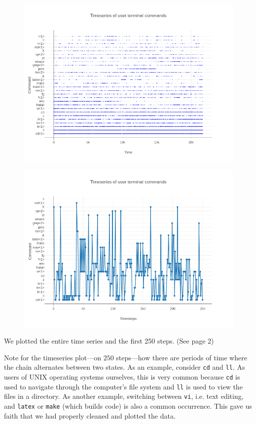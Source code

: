 \documentclass[10pt]{article}
\begin{document}
\begin{figure}[!htb]
  \centering
  \includegraphics[scale=.45]{../pictures/complete-empirical-timeseries.png}
  \caption{}
\end{figure}

\begin{figure}[!htb]
  \centering
  \includegraphics[scale=.45]{../pictures/250-empirical-timesteps.png}
  \caption{}
\end{figure}

We plotted the entire time series and the first 250 steps. (See page 2)

Note for the timeseries plot---on $250$ steps---how there are periods of time
where the chain alternates between two states. As an example, consider
\texttt{cd} and \texttt{ll}. As users of UNIX operating systems ourselves, this
is very common because \texttt{cd} is used to navigate through the computer's
file system and \texttt{ll} is used to view the files in a directory. As another
example, switching between \texttt{vi}, i.e. text editing, and \texttt{latex}
or \texttt{make} (which builds code) is also a common occurrence. This gave us
faith that we had properly cleaned and plotted the data.
\end{document}
